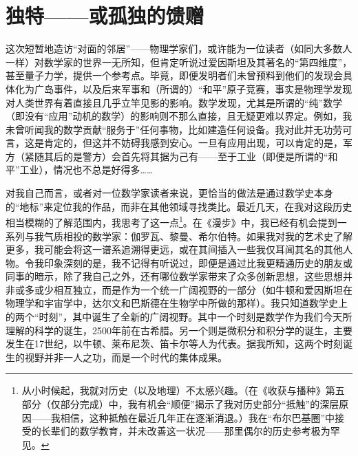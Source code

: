 
\section{独特——或孤独的馈赠}

这次短暂地造访“对面的邻居”——物理学家们，或许能为一位读者（如同大多数人一样）对数学家的世界一无所知，但肯定听说过爱因斯坦及其著名的“第四维度”，甚至量子力学，提供一个参考点。毕竟，即便发明者们未曾预料到他们的发现会具体化为广岛事件，以及后来军事和（所谓的）“和平”原子竞赛，事实是物理学发现对人类世界有着直接且几乎立竿见影的影响。数学发现，尤其是所谓的“纯”数学（即没有“应用”动机的数学）的影响则不那么直接，且无疑更难以界定。例如，我未曾听闻我的数学贡献“服务于”任何事物，比如建造任何设备。我对此并无功劳可言，这是肯定的，但这并不妨碍我感到安心。一旦有应用出现，可以肯定的是，军方（紧随其后的是警方）会首先将其据为己有——至于工业（即便是所谓的“和平”工业），情况也不总是好得多……

对我自己而言，或者对一位数学家读者来说，更恰当的做法是通过数学史本身的“地标”来定位我的作品，而非在其他领域寻找类比。最近几天，在我对这段历史相当模糊的了解范围内，我思考了这一点\footnote{从小时候起，我就对历史（以及地理）不太感兴趣。（在《收获与播种》第五部分（仅部分完成）中，我有机会“顺便”揭示了我对历史部分“抵触”的深层原因——我相信，这种抵触在最近几年正在逐渐消退。）我在“布尔巴基圈”中接受的长辈们的数学教育，并未改善这一状况——那里偶尔的历史参考极为罕见。}。在《漫步》中，我已经有机会提到一系列与我气质相投的数学家：伽罗瓦、黎曼、希尔伯特。如果我对我的艺术史了解更多，我可能会将这一谱系追溯得更远，或在其间插入一些我仅耳闻其名的其他人物。令我印象深刻的是，我不记得有听说过，即便是通过比我更精通历史的朋友或同事的暗示，除了我自己之外，还有哪位数学家带来了众多创新思想，这些思想并非或多或少相互独立，而是作为一个统一广阔视野的一部分（如牛顿和爱因斯坦在物理学和宇宙学中，达尔文和巴斯德在生物学中所做的那样）。我只知道数学史上的两个“时刻”，其中诞生了全新的广阔视野。其中一个时刻是数学作为我们今天所理解的科学的诞生，2500年前在古希腊。另一个则是微积分和积分学的诞生，主要发生在17世纪，以牛顿、莱布尼茨、笛卡尔等人为代表。据我所知，这两个时刻诞生的视野并非一人之功，而是一个时代的集体成果。

